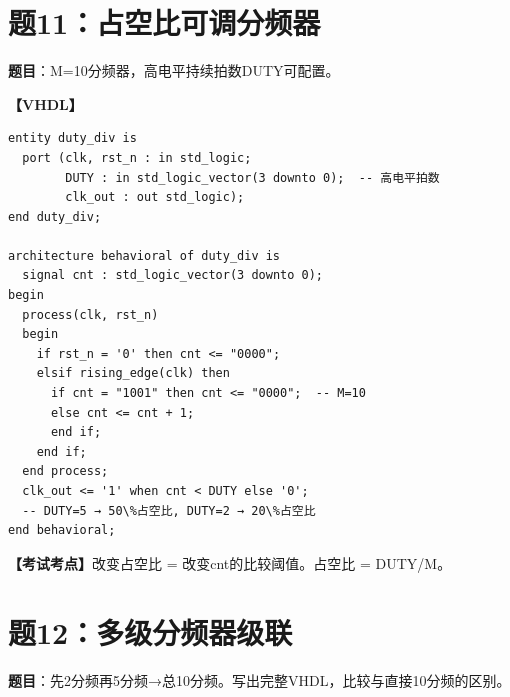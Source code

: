 \section{题11：占空比可调分频器}

\textbf{题目}：M=10分频器，高电平持续拍数DUTY可配置。

\begin{solution}[完整解答]

\textbf{【VHDL】}
\begin{lstlisting}
entity duty_div is
  port (clk, rst_n : in std_logic;
        DUTY : in std_logic_vector(3 downto 0);  -- 高电平拍数
        clk_out : out std_logic);
end duty_div;

architecture behavioral of duty_div is
  signal cnt : std_logic_vector(3 downto 0);
begin
  process(clk, rst_n)
  begin
    if rst_n = '0' then cnt <= "0000";
    elsif rising_edge(clk) then
      if cnt = "1001" then cnt <= "0000";  -- M=10
      else cnt <= cnt + 1;
      end if;
    end if;
  end process;
  clk_out <= '1' when cnt < DUTY else '0';
  -- DUTY=5 → 50\%占空比, DUTY=2 → 20\%占空比
end behavioral;
\end{lstlisting}

\textbf{【考试考点】}改变占空比 = 改变cnt的比较阈值。占空比 = DUTY/M。

\end{solution}


\section{题12：多级分频器级联}

\textbf{题目}：先2分频再5分频→总10分频。写出完整VHDL，比较与直接10分频的区别。

